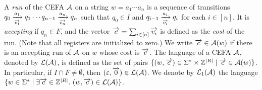 A \emph{run} of the CEFA $\mathcal{A}$ on a string $w = a_1 \cdots a_n$ is a sequence of transitions $q_0 \xrightarrow[\overrightarrow{v_1}]{a_1} q_1 \cdots q_{n-1}\xrightarrow[\overrightarrow{v_n}]{a_n} q_n$ such that $q_0 \in I$ and $q_{i-1} \xrightarrow[\overrightarrow{v_i}]{a_i} q_i$ for each $i \in [n]$. 
%
It is \emph{accepting} if $q_n \in F$, and 
%
the vector $\overrightarrow{c}= \sum_{i \in [n]} \overrightarrow{v_i}$ is defined as the \emph{cost} of the run. %
(Note that all registers are initialized to zero.) 
%
We write $\overrightarrow{c} \in \mathcal{A}(w)$ if there is an accepting run of $\mathcal{A}$ on $w$ whose cost is $\overrightarrow{c}$.  The language of a CEFA $\mathcal{A}$, denoted by $\mathcal{L}(\mathcal{A})$, is defined as the set of pairs $\{(w, \overrightarrow{c})\in\Sigma^*\times \mathbb{Z}^{|R|} \mid  \overrightarrow{c} \in \mathcal{A}(w)\}$.
%
In particular, if $I \cap F \neq \emptyset$, then $(\varepsilon, \overrightarrow{0}) \in \mathcal{L}(\mathcal{A})$. 
We denote by $\mathcal{L}_1(\mathcal{A})$ the language $\{w\in\Sigma^*\mid \exists \overrightarrow{c}\in \mathbb{Z}^{|R|}.\ (w, \overrightarrow{c})\in \mathcal{L}(\mathcal{A})\}$.




